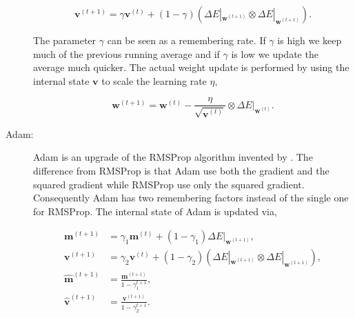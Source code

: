 \begin{description}
        \begin{equation}
            \label{eq:rms_prop_state}
            \mathbf{v}^{(t+1)} =
                \gamma\mathbf{v}^{(t)} +
                (1 - \gamma)\left(
                    \Delta E|_{\mathbf{w}^{(t + 1)}} \otimes
                    \Delta E|_{\mathbf{w}^{(t + 1)}}
                \right).
        \end{equation}

        The parameter $\gamma$ can be seen as a remembering rate. If $\gamma$
        is high we keep much of the previous running average and if $\gamma$
        is low we update the average much quicker. The actual weight update is
        performed by using the internal state $\mathbf{v}$ to scale the learning
        rate $\eta$,

        \begin{equation}
            \mathbf{w}^{(t+1)} =
                \mathbf{w}^{(t)} -
                \frac{\eta}{\sqrt{\mathbf{v}^{(t)}}} \otimes
                \Delta E|_{\mathbf{w}^{(t)}}.
        \end{equation}

    \item[\gls{Adam}:]

        \gls{Adam} is an upgrade of the \gls{RMSProp} algorithm invented by
        \citet{DBLP:journals/corr/KingmaB14}. The difference from \gls{RMSProp}
        is that \gls{Adam} use both the gradient and the squared gradient while
        \gls{RMSProp} use only the squared gradient. Consequently \gls{Adam} has
        two remembering factors instead of the single one for \gls{RMSProp}. The
        internal state of \gls{Adam} is updated via,

        \begin{align}
            \mathbf{m}^{(t+1)} &=
                \gamma_1\mathbf{m}^{(t)} +
                (1 - \gamma_1) \Delta E|_{\mathbf{w}^{(t+1)}}, \\
            \mathbf{v}^{(t+1)} &=
                \gamma_2\mathbf{v}^{(t)} +
                (1 - \gamma_2) \left(
                    \Delta E|_{\mathbf{w}^{(t+1)}} \otimes \Delta E|_{\mathbf{w}^{(t+1)}}
                \right), \\
            \mathbf{\hat{m}}^{(t+1)} &=
                \frac{\mathbf{m}^{(t+1)}}{1 - \gamma_1^{t + 1}}, \\
            \mathbf{\hat{v}}^{(t+1)} &=
                \frac{\mathbf{v}^{(t+1)}}{1 - \gamma_2^{t + 1}}.
        \end{align}


\end{description}
